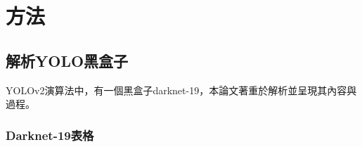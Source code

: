 \chapter{方法}
\label{c:3}

\section{解析YOLO黑盒子}

YOLOv2演算法中，有一個黑盒子darknet-19，本論文著重於解析並呈現其內容與過程。

\subsection{Darknet-19表格}

